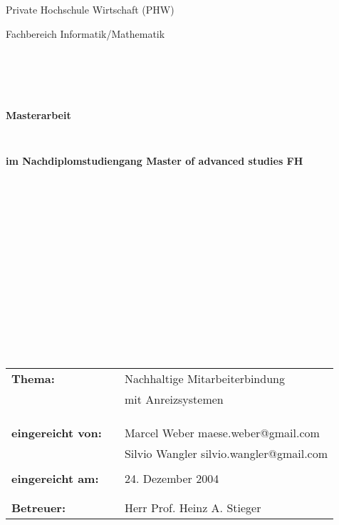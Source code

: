 \begin{titlepage}
\thispagestyle{empty}
\begin{center}
\Large{Private Hochschule Wirtschaft (PHW)}\\
\end{center}


\begin{center}
\Large{Fachbereich Informatik/Mathematik}
\end{center}
\begin{verbatim}





\end{verbatim}
\begin{center}
\textbf{\LARGE{Masterarbeit}}
\end{center}
\begin{verbatim}


\end{verbatim}
\begin{center}
\textbf{im Nachdiplomstudiengang Master of advanced studies FH}
\end{center}
\begin{verbatim}
















\end{verbatim}

\begin{flushleft}
\begin{tabular}{lll}
\textbf{Thema:} & & Nachhaltige Mitarbeiterbindung \\
& & mit Anreizsystemen\\
& & \\
& & \\
& & \\
\textbf{eingereicht von:} & & Marcel Weber \flq{}maese.weber@gmail.com\frq{}\\
& & Silvio Wangler \flq{}silvio.wangler@gmail.com\frq{}\\
& & \\
\textbf{eingereicht am:} & & 24. Dezember 2004\\
& & \\
& & \\
\textbf{Betreuer:} & & Herr Prof. Heinz A. Stieger
\end{tabular}
\end{flushleft}
\end{titlepage}